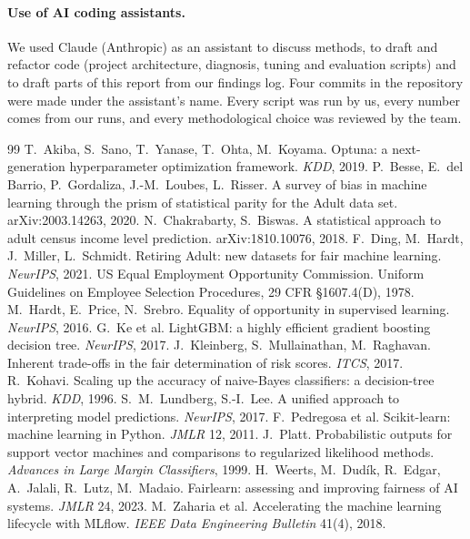 \documentclass[11pt,a4paper]{article}
\begin{document}
\paragraph{Use of AI coding assistants.} We used Claude (Anthropic) as an assistant to discuss methods, to draft and refactor code (project architecture, diagnosis, tuning and evaluation scripts) and to draft parts of this report from our findings log. Four commits in the repository were made under the assistant's name. Every script was run by us, every number comes from our runs, and every methodological choice was reviewed by the team.

\begin{thebibliography}{99}\small
{} T.~Akiba, S.~Sano, T.~Yanase, T.~Ohta, M.~Koyama. Optuna: a next-generation hyperparameter optimization framework. \emph{KDD}, 2019.
 P.~Besse, E.~del Barrio, P.~Gordaliza, J.-M.~Loubes, L.~Risser. A survey of bias in machine learning through the prism of statistical parity for the Adult data set. arXiv:2003.14263, 2020.
 N.~Chakrabarty, S.~Biswas. A statistical approach to adult census income level prediction. arXiv:1810.10076, 2018.
 F.~Ding, M.~Hardt, J.~Miller, L.~Schmidt. Retiring Adult: new datasets for fair machine learning. \emph{NeurIPS}, 2021.
 US Equal Employment Opportunity Commission. Uniform Guidelines on Employee Selection Procedures, 29 CFR \S1607.4(D), 1978.
 M.~Hardt, E.~Price, N.~Srebro. Equality of opportunity in supervised learning. \emph{NeurIPS}, 2016.
 G.~Ke et al. LightGBM: a highly efficient gradient boosting decision tree. \emph{NeurIPS}, 2017.
 J.~Kleinberg, S.~Mullainathan, M.~Raghavan. Inherent trade-offs in the fair determination of risk scores. \emph{ITCS}, 2017.
 R.~Kohavi. Scaling up the accuracy of naive-Bayes classifiers: a decision-tree hybrid. \emph{KDD}, 1996.
 S.~M.~Lundberg, S.-I.~Lee. A unified approach to interpreting model predictions. \emph{NeurIPS}, 2017.
 F.~Pedregosa et al. Scikit-learn: machine learning in Python. \emph{JMLR} 12, 2011.
 J.~Platt. Probabilistic outputs for support vector machines and comparisons to regularized likelihood methods. \emph{Advances in Large Margin Classifiers}, 1999.
 H.~Weerts, M.~Dud\'ik, R.~Edgar, A.~Jalali, R.~Lutz, M.~Madaio. Fairlearn: assessing and improving fairness of AI systems. \emph{JMLR} 24, 2023.
 M.~Zaharia et al. Accelerating the machine learning lifecycle with MLflow. \emph{IEEE Data Engineering Bulletin} 41(4), 2018.
\end{thebibliography}
\end{document}
